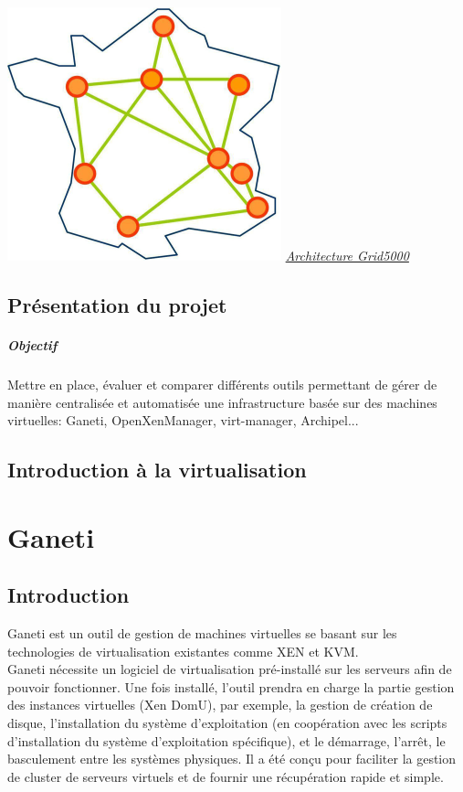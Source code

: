 \documentclass[a4paper,11pt]{report}
\begin{document}
\newpage
\begin{center}
\includegraphics{g5k.png}
\underline{\textit{Architecture Grid5000}}
\end{center}

     \newpage
     \section{Présentation du projet}
     \paragraph{Objectif}
Mettre en place, évaluer et comparer différents outils permettant de gérer de manière
centralisée et automatisée une infrastructure basée sur des machines virtuelles: Ganeti,
OpenXenManager, virt-manager, Archipel...
      \section{Introduction à la virtualisation}

    \chapter{Ganeti}
      \section{Introduction}
Ganeti est un outil de gestion de machines virtuelles se basant sur les technologies de virtualisation existantes comme XEN et KVM.\\
Ganeti nécessite un logiciel de virtualisation pré-installé sur les serveurs afin de pouvoir fonctionner. Une fois installé, 
l'outil prendra en charge la partie gestion des instances virtuelles (Xen DomU), par exemple, la gestion de création de disque, 
l'installation du système d'exploitation (en coopération avec les scripts d'installation du système d'exploitation 
spécifique), et le démarrage, l'arrêt, le basculement entre les systèmes physiques. Il a été conçu pour faciliter la gestion de 
cluster de serveurs virtuels et de fournir une récupération rapide et simple.
\end{document}
